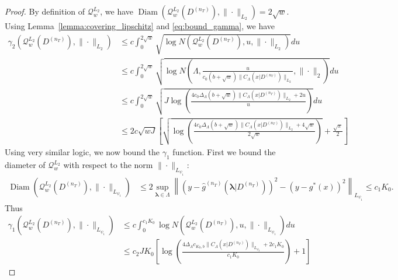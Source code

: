 \documentclass[10pt]{book}
\theoremstyle{definition}
\DeclareMathOperator{\Diam}{Diam}
\begin{document}
\begin{proof}
	By definition of $\mathcal{Q}_{w}^{L_{2}}$, we have $\Diam\left(\mathcal{Q}_{w}^{L_{2}}(D^{(n_{T})}),\|\cdot\|_{L_{2}}\right)	=	2\sqrt{w}.$
	Using Lemma~\ref{lemma:covering_lipschitz} and \eqref{eq:bound_gamma}, we have
	\begin{align}
	\gamma_{2}\left(\mathcal{Q}_{w}^{L_{2}}(D^{(n_{T})}),\|\cdot\|_{L_{2}}\right)
	& \le	c\int_{0}^{2\sqrt{w}}\sqrt{\log N\left(\mathcal{Q}_{w}^{L_{2}}(D^{(n_{T})}),u,\|\cdot\|_{L_{2}}\right)}du \\
	& \le	c\int_{0}^{2\sqrt{w}}\sqrt{\log N\left(\Lambda,\frac{u}{c_0 \left(b +\sqrt{w}\right)\|C_\Lambda(x|D^{(n_T)})\|_{L_{2}}},\|\cdot\|_{2}\right)}du \\
	& \le	c\int_{0}^{2\sqrt{w}}\sqrt{J\log\left(\frac{4 c_0 \Delta_{\Lambda}\left(b +\sqrt{w}\right)\|C_\Lambda(x|D^{(n_T)})\|_{L_{2}}+2u}{u}\right)}du\\
	& \le	2c\sqrt{w J}\left[\sqrt{\log\left(\frac{4 c_0  \Delta_{\Lambda}\left(b +\sqrt{w}\right)\|C_\Lambda(x|D^{(n_T)})\|_{L_{2}}+4\sqrt{w}}{2\sqrt{w}}\right)}+\frac{\sqrt{\pi}}{2}\right]
	\end{align}
	Using very similar logic, we now bound the $\gamma_1$ function.
	First we bound the diameter of $\mathcal{Q}_w^{L_2}$ with respect to the norm $\|\cdot \|_{L_{\psi_1}}$:
	\begin{align}
	\Diam(\mathcal{Q}_w^{L_2}(D^{(n_T)}), \|\cdot \|_{L_{\psi_1}})
	& \le 2 \sup_{\boldsymbol{\lambda} \in \Lambda}
	\left \|
	\left(
	y - \hat{g}^{(n_T)}(\boldsymbol{\lambda}| D^{(n_T)})
	\right)^2
	-
	\left(
	y - g^*(x)
	\right)^2
	\right \|_{L_{\psi_1}}
	\le
	c_1 K_0.
	\label{eq:diam_psi1}
	\end{align}
	Thus
	\begin{align}
	\gamma_{1}\left(\mathcal{Q}_{w}^{L_{2}}(D^{(n_{T})}),\|\cdot\|_{L_{\psi_{1}}}\right)
	&\le c\int_{0}^{c_1 K_0}\log N\left(\mathcal{Q}_{w}^{L_{2}}(D^{(n_{T})}),u,\|\cdot\|_{L_{\psi_{1}}}\right)du\\
	& \le c_2 J K_0 \left[
	\log\left(
	\frac{4 \Delta_{\Lambda}c_{K_0, b} \|C_\Lambda(x|D^{(n_T)})\|_{L_{\psi_{2}}}+ 2 c_1 K_0}
	{c_1 K_0}
	\right)+1\right]
	\end{align}
\end{proof}
\end{document}
